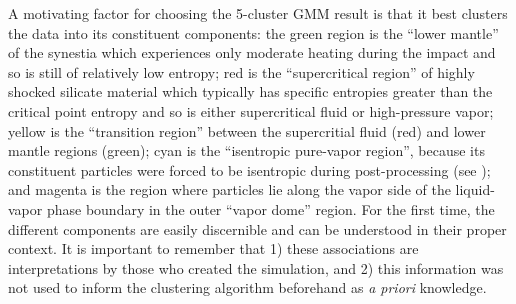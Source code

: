 \documentclass[fleqn,usenatbib,useAMS]{mnras}
\begin{document}
A motivating factor for choosing the 5-cluster GMM result is that it best clusters the data into its constituent components: the green region is the ``lower mantle'' of the synestia which experiences only moderate heating during the impact and so is still of relatively low entropy; red is the ``supercritical region'' of highly shocked silicate material which typically has specific entropies greater than the critical point entropy and so is either supercritical fluid or high-pressure vapor; yellow is the ``transition region'' between the supercritial fluid (red) and lower mantle regions (green); cyan is the ``isentropic pure-vapor region'', because its constituent particles were forced to be isentropic during post-processing (see \cite{Lock18}); and magenta is the region where particles lie along the vapor side of the liquid-vapor phase boundary in the outer ``vapor dome'' region. For the first time, the different components are easily discernible and can be understood in their proper context. It is important to remember that 1) these associations are interpretations by those who created the simulation, and 2) this information was not used to inform the clustering algorithm beforehand as \textit{a priori} knowledge. \par
\end{document}
